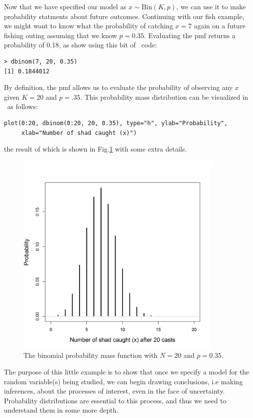 Now that we have specified our model as $x \sim \text{Bin}(K,p)$,
we can use it to make probability statments about future
outcomes. Continuing with our fish example, we might want to know what
the probability of catching $x=7$ again on a future fishing outing
assuming that we know $p=0.35$. Evaluating the pmf returns a
probability of 0.18, as show using this bit of \R~code:
\begin{verbatim}
> dbinom(7, 20, 0.35)
[1] 0.1844012
\end{verbatim}
By definition, the pmf allows us to evaluate the probability of observing
any $x$ given $K=20$ and $p=.35$. This probability mass distribution
can be visualized in \R~as follows:
\begin{verbatim}
plot(0:20, dbinom(0:20, 20, 0.35), type="h", ylab="Probability",
     xlab="Number of shad caught (x)")
\end{verbatim}
the result of which is shown in Fig.\ref{modeling.fig.bin} with some extra details.
\begin{figure}[ht!]
  \centering
  \includegraphics[width=4in,height=4in]{Ch1b/figs/bin}
\caption{The binomial probability mass function with $N=20$ and
  $p=0.35$. }
\label{modeling.fig.bin}
\end{figure}

The purpose of this little example is to show that once we specify a
model for the random variable(s) being studied, we can begin drawing
conclusions, i.e making inferences, about the processes of interest,
even in the face of uncertainty. Probability distributions are
essential to this process, and thus we need to
understand them in some more depth.


